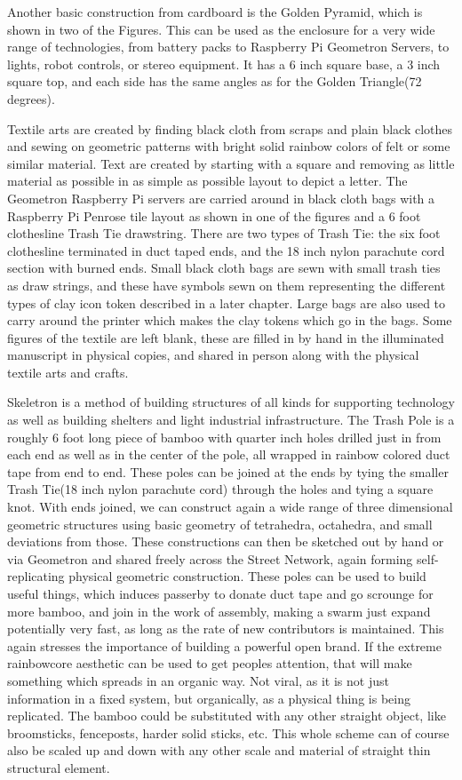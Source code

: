 Another basic construction from cardboard is the Golden Pyramid, which is shown in two of the Figures.  This can be used as the enclosure for a very wide range of technologies, from battery packs to Raspberry Pi Geometron Servers, to lights, robot controls, or stereo equipment.  It has a 6 inch square base, a 3 inch square top, and each side has the same angles as for the Golden Triangle(72 degrees).

Textile arts are created by finding black cloth from scraps and plain black clothes and sewing on geometric patterns with bright solid rainbow colors of felt or some similar material.  Text are created by starting with a square and removing as little material as possible in as simple as possible layout to depict a letter.  The Geometron Raspberry Pi servers are carried around in black cloth bags with a Raspberry Pi Penrose tile layout as shown in one of the figures and a 6 foot clothesline Trash Tie drawstring.  There are two types of Trash Tie: the six foot clothesline terminated in duct taped ends, and the 18 inch nylon parachute cord section with burned ends.  Small black cloth bags are sewn with small trash ties as draw strings, and these have symbols sewn on them representing the different types of clay icon token described in a later chapter.  Large bags are also used to carry around the printer which makes the clay tokens which go in the bags.  Some figures of the textile are left blank, these are filled in by hand in the illuminated manuscript in physical copies, and shared in person along with the physical textile arts and crafts.


Skeletron is a method of building structures of all kinds for supporting technology as well as building shelters and light industrial infrastructure.  The Trash Pole is a roughly 6 foot long piece of bamboo with quarter inch holes drilled just in from each end as well as in the center of the pole, all wrapped in rainbow colored duct tape from end to end.  These poles can be joined at the ends by tying the smaller Trash Tie(18 inch nylon parachute cord) through the holes and tying a square knot.  With ends joined, we can construct again a wide range of three dimensional geometric structures using basic geometry of tetrahedra, octahedra, and small deviations from those.  These constructions can then be sketched out by hand or via Geometron and shared freely across the Street Network, again forming self-replicating physical geometric construction.  These poles can be used to build useful things, which induces passerby to donate duct tape and go scrounge for more bamboo, and join in the work of assembly, making a swarm just expand potentially very fast, as long as the rate of new contributors is maintained.  This again stresses the importance of building a powerful open brand.  If the extreme rainbowcore aesthetic can be used to get peoples attention, that will make something which spreads in an organic way.  Not viral, as it is not just information in a fixed system, but organically, as a physical thing is being replicated.  The bamboo could be substituted with any other straight object, like broomsticks, fenceposts, harder solid sticks, etc.  This whole scheme can of course also be scaled up and down with any other scale and material of straight thin structural element.  

